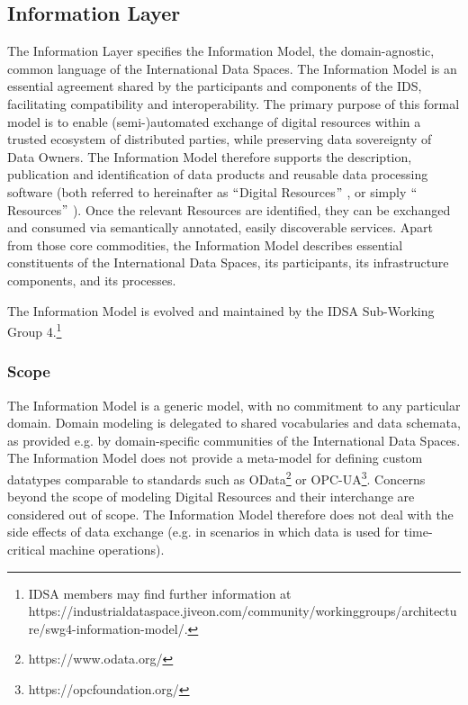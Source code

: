 
\subsection{Information Layer}
The Information Layer specifies the Information Model, the domain-agnostic, common language of the International Data Spaces. The Information Model is an essential agreement shared by the participants and components of the IDS, facilitating compatibility and interoperability. The primary purpose of this formal model is to enable (semi-)automated exchange of digital resources within a trusted ecosystem of distributed parties, while preserving data sovereignty of Data Owners. The Information Model therefore supports the description, publication and identification of data products and reusable data processing software (both referred to hereinafter as $``$Digital Resources$"$ , or simply $``$Resources$"$ ). Once the relevant Resources are identified, they can be exchanged and consumed via semantically annotated, easily discoverable services. Apart from those core commodities, the Information Model describes essential constituents of the International Data Spaces, its participants, its infrastructure components, and its processes.

The Information Model is evolved and maintained by the IDSA Sub-Working Group 4.\footnote{IDSA members may find further information at https://industrialdataspace.jiveon.com/community/workinggroups/architecture/swg4-information-model/.}

\subsubsection{Scope}
The Information Model is a generic model, with no commitment to any particular domain. Domain modeling is delegated to shared vocabularies and data schemata, as provided e.g. by domain-specific communities of the International Data Spaces. The Information Model does not provide a meta-model for defining custom datatypes comparable to standards such as OData\footnote{https://www.odata.org/ } or OPC-UA\footnote{https://opcfoundation.org/ }. Concerns beyond the scope of modeling Digital Resources and their interchange are considered out of scope. The Information Model therefore does not deal with the side effects of data exchange (e.g. in scenarios in which data is used for time-critical machine operations).

